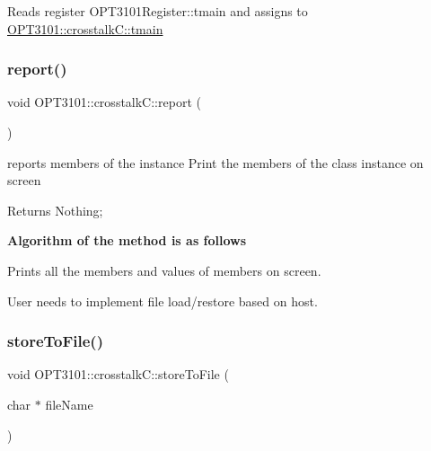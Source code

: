 \begin{DoxyItemize}
\item Reads register O\+P\+T3101\+Register\+::tmain and assigns to \mbox{\hyperlink{class_o_p_t3101_1_1crosstalk_c_a8b7250b531e953587c665c2c43860d82}{O\+P\+T3101\+::crosstalk\+C\+::tmain}} 
\end{DoxyItemize}\mbox{\label{class_o_p_t3101_1_1crosstalk_c_a8a611602b13d6f3e97049696ddebe209}} 
\subsubsection{\texorpdfstring{report()}{report()}}
{\footnotesize\ttfamily void O\+P\+T3101\+::crosstalk\+C\+::report (\begin{DoxyParamCaption}{ }\end{DoxyParamCaption})}



reports members of the instance Print the members of the class instance on screen 

\begin{DoxyReturn}{Returns}
Nothing; 
\end{DoxyReturn}
{\bfseries Algorithm of the method is as follows}


\begin{DoxyItemize}
\item Prints all the members and values of members on screen. ~\newline

\item User needs to implement file load/restore based on host. 
\end{DoxyItemize}\mbox{\label{class_o_p_t3101_1_1crosstalk_c_a7d887d736dd5a3aa9dd81224e67240b8}} 
\subsubsection{\texorpdfstring{store\+To\+File()}{storeToFile()}}
{\footnotesize\ttfamily void O\+P\+T3101\+::crosstalk\+C\+::store\+To\+File (\begin{DoxyParamCaption}\item[{char $\ast$}]{file\+Name }\end{DoxyParamCaption})}



